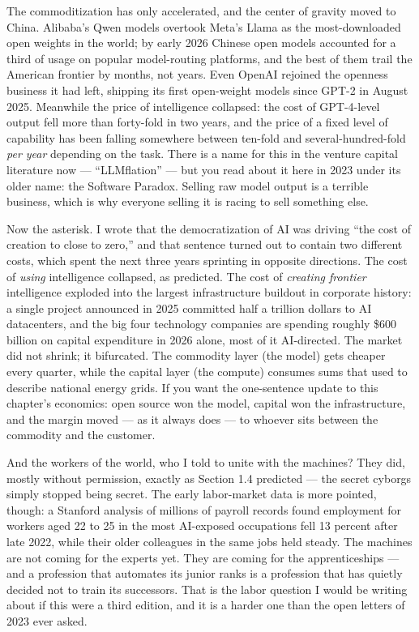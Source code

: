 The commoditization has only accelerated, and the center of gravity moved to China. Alibaba's Qwen models overtook Meta's Llama as the most-downloaded open weights in the world; by early 2026 Chinese open models accounted for a third of usage on popular model-routing platforms, and the best of them trail the American frontier by months, not years. Even OpenAI rejoined the openness business it had left, shipping its first open-weight models since GPT-2 in August 2025. Meanwhile the price of intelligence collapsed: the cost of GPT-4-level output fell more than forty-fold in two years, and the price of a fixed level of capability has been falling somewhere between ten-fold and several-hundred-fold \textit{per year} depending on the task. There is a name for this in the venture capital literature now --- ``LLMflation'' --- but you read about it here in 2023 under its older name: the Software Paradox. Selling raw model output is a terrible business, which is why everyone selling it is racing to sell something else.

Now the asterisk. I wrote that the democratization of AI was driving ``the cost of creation to close to zero,'' and that sentence turned out to contain two different costs, which spent the next three years sprinting in opposite directions. The cost of \textit{using} intelligence collapsed, as predicted. The cost of \textit{creating frontier} intelligence exploded into the largest infrastructure buildout in corporate history: a single project announced in 2025 committed half a trillion dollars to AI datacenters, and the big four technology companies are spending roughly \$600 billion on capital expenditure in 2026 alone, most of it AI-directed. The market did not shrink; it bifurcated. The commodity layer (the model) gets cheaper every quarter, while the capital layer (the compute) consumes sums that used to describe national energy grids. If you want the one-sentence update to this chapter's economics: open source won the model, capital won the infrastructure, and the margin moved --- as it always does --- to whoever sits between the commodity and the customer.

And the workers of the world, who I told to unite with the machines? They did, mostly without permission, exactly as Section 1.4 predicted --- the secret cyborgs simply stopped being secret. The early labor-market data is more pointed, though: a Stanford analysis of millions of payroll records found employment for workers aged 22 to 25 in the most AI-exposed occupations fell 13 percent after late 2022, while their older colleagues in the same jobs held steady. The machines are not coming for the experts yet. They are coming for the apprenticeships --- and a profession that automates its junior ranks is a profession that has quietly decided not to train its successors. That is the labor question I would be writing about if this were a third edition, and it is a harder one than the open letters of 2023 ever asked.

